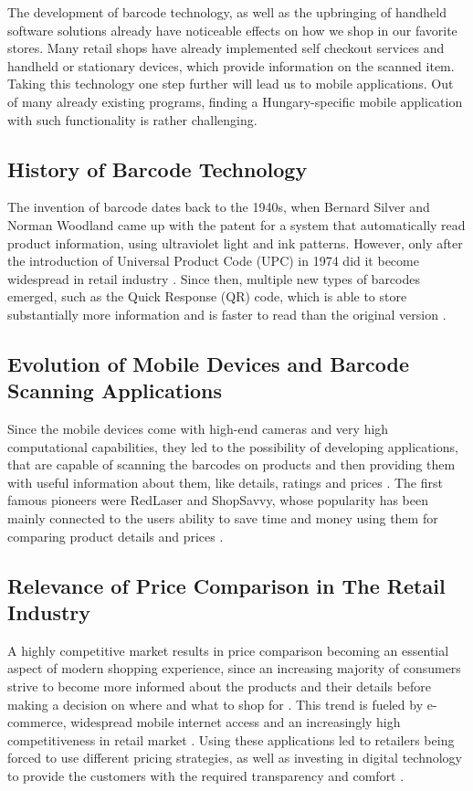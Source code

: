 The development of barcode technology, as well as the upbringing of handheld software solutions already have noticeable effects on how we shop in our favorite stores. Many retail shops have already implemented self checkout services and handheld or stationary devices, which provide information on the scanned item. Taking this technology one step further will lead us to mobile applications. Out of many already existing programs, finding a Hungary-specific mobile application with such functionality is rather challenging.

\subsection{History of Barcode Technology}
The invention of barcode dates back to the 1940s, when Bernard Silver and Norman Woodland came up with the patent for a system that automatically read product information, using ultraviolet light and ink patterns. However, only after the introduction of Universal Product Code (UPC) in 1974 did it become widespread in retail industry \cite{weightman2015}. Since then, multiple new types of barcodes emerged, such as the Quick Response (QR) code, which is able to store substantially more information and is faster to read than the original version \cite{densowave2011}. 

\subsection{Evolution of Mobile Devices and Barcode Scanning Applications}

Since the mobile devices come with high-end cameras and very high computational capabilities, they led to the possibility of developing applications, that are capable of scanning the barcodes on products and then providing them with useful information about them, like details, ratings and prices \cite{chen2012}. The first famous pioneers were RedLaser and ShopSavvy, whose popularity has been mainly connected to the users ability to save time and money using them for comparing product details and prices \cite{rao2011}.

\subsection{Relevance of Price Comparison in The Retail Industry}

A highly competitive market results in price comparison becoming an essential aspect of modern shopping experience, since an increasing majority of consumers strive to become more informed about the products and their details before making a decision on where and what to shop for \cite{huang2006}. This trend is fueled by e-commerce, widespread mobile internet access and an increasingly high competitiveness in retail market \cite{pentina2014}. Using these applications led to retailers being forced to use different pricing strategies, as well as investing in digital technology to provide the customers with the required transparency and comfort \cite{grewal2011}.